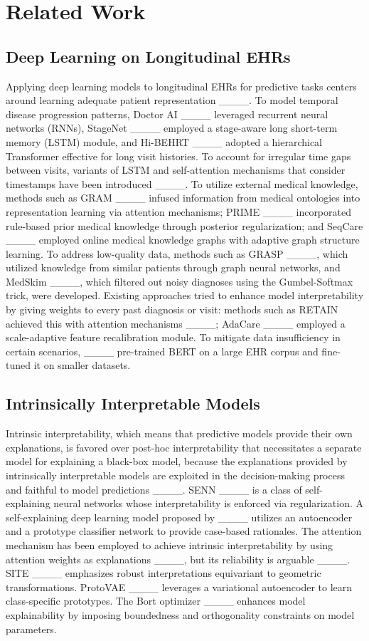 \section{Related Work}
\subsection{Deep Learning on Longitudinal EHRs}
Applying deep learning models to longitudinal EHRs for predictive tasks centers around learning adequate patient representation ____. To model temporal disease progression patterns, Doctor AI ____ leveraged recurrent neural networks (RNNs), StageNet ____ employed a stage-aware long short-term memory (LSTM) module, and Hi-BEHRT ____ adopted a hierarchical Transformer effective for long visit histories. To account for irregular time gaps between visits, variants of LSTM and self-attention mechanisms that consider timestamps have been introduced ____. To utilize external medical knowledge, methods such as GRAM ____ infused information from medical ontologies into representation learning via attention mechanisms; PRIME ____ incorporated rule-based prior medical knowledge through posterior regularization; and SeqCare ____ employed online medical knowledge graphs with adaptive graph structure learning. To address low-quality data, methods such as GRASP ____, which utilized knowledge from similar patients through graph neural networks, and MedSkim ____, which filtered out noisy diagnoses using the Gumbel-Softmax trick, were developed. Existing approaches tried to enhance model interpretability by giving weights to every past diagnosis or visit: methods such as RETAIN achieved this with attention mechanisms ____; AdaCare ____ employed a scale-adaptive feature recalibration module. To mitigate data insufficiency in certain scenarios, ____ pre-trained BERT on a large EHR corpus and fine-tuned it on smaller datasets.

\subsection{Intrinsically Interpretable Models}
Intrinsic interpretability, which means that predictive models provide their own explanations, is favored over post-hoc interpretability that necessitates a separate model for explaining a black-box model, because the explanations provided by intrinsically interpretable models are exploited in the decision-making process and faithful to model predictions ____. SENN ____ is a class of self-explaining neural networks whose interpretability is enforced via regularization. A self-explaining deep learning model proposed by ____ utilizes an autoencoder and a prototype classifier network to provide case-based rationales. The attention mechanism has been employed to achieve intrinsic interpretability by using attention weights as explanations ____, but its reliability is arguable ____. SITE ____ emphasizes robust interpretations equivariant to geometric transformations. ProtoVAE ____ leverages a variational autoencoder to learn class-specific prototypes. The Bort optimizer ____ enhances model explainability by imposing boundedness and orthogonality constraints on model parameters.

